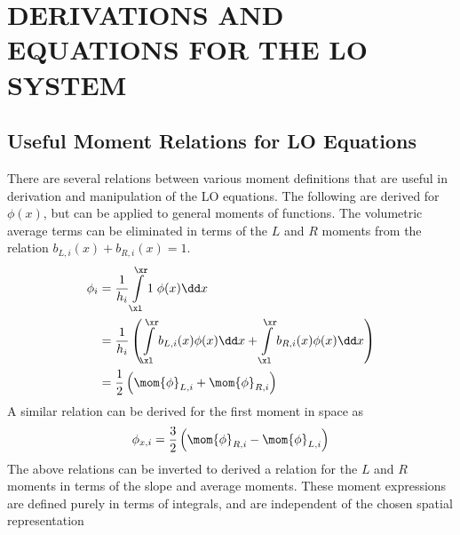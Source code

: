 %
%
%



\chapter{\uppercase{Derivations and Equations for the LO System}}

\section{Useful Moment Relations for LO Equations}
\label{app:lo_mom_relations}

There are several relations between various moment definitions that are useful in
derivation and manipulation of the LO equations. The following are derived for $\phi(x)$,
but can be applied to general moments of functions.  The volumetric average terms
can be eliminated in terms of the $L$ and $R$ moments from the relation
$b_{L,i}(x)+b_{R,i}(x)=1$.
\begin{align}\label{app:atoL}
    \phi_{i} &= \frac{1}{h_i} \int\limits_\xl^\xr 1 \;\phi(x) \dd x \\
             &= \frac{1}{h_i} \left(\int\limits_\xl^\xr b_{L,i}(x) \phi(x) \dd x +
             \int\limits_\xl^\xr b_{R,i}(x) \phi(x) \dd x \right)\\
             &= \frac{1}{2} \left( \mom{\phi}_{L,i} + \mom{\phi}_{R,i} \right)
\end{align}
A similar relation can be derived for the first moment in space as
\begin{equation}
    {\phi}_{x,i} = \frac{3}{2} \left(\mom{\phi}_{R,i} - \mom{\phi}_{L,i}\right)
\end{equation}
The above relations can be inverted to derived a relation for the $L$ and $R$ moments in terms of the slope
and average moments.  These moment expressions are defined purely in terms of integrals,
and are independent of the chosen spatial representation

